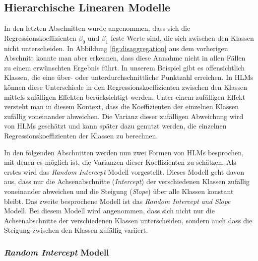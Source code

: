 \documentclass[12pt]{article}\usepackage[]{graphicx}\usepackage[]{color}
\begin{document}
\subsection{Hierarchische Linearen Modelle}
In den letzten Abschnitten wurde angenommen, dass sich die Regressionskoeffizienten $\beta_0$ und $\beta_1$ feste Werte sind, die sich zwischen den Klassen nicht unterscheiden. In Abbildung \ref{fig:disaggregation} aus dem vorherigen Abschnitt konnte man aber erkennen, dass diese Annahme nicht in allen Fällen zu einem erwünschten Ergebnis führt. In unserem Beispiel gibt es offensichtlich Klassen, die eine über- oder unterdurchschnittliche Punktzahl erreichen. In HLMs können diese Unterschiede in den Regressionskoeffizienten zwischen den Klassen mittels zufälligen Effekten berücksichtigt werden. Unter einem zufälligen Effekt versteht man in diesem Kontext, dass die Koeffizienten der einzelnen Klassen zufällig voneinander abweichen. Die Varianz dieser zufälligen Abweichung wird von HLMs geschätzt und kann später dazu genutzt werden, die einzelnen Regressionskoeffizienten der Klassen zu berechnen.

In den folgenden Abschnitten werden nun zwei Formen von HLMs besprochen, mit denen es möglich ist, die Varianzen dieser Koeffizienten zu schätzen. Als erstes wird das \textit{Random Intercept} Modell vorgestellt. Dieses Modell geht davon aus, dass nur die Achsenabschnitte (\textit{Intercept}) der verschiedenen Klassen zufällig voneinander abweichen und die Steigung (\textit{Slope}) über alle Klassen konstant bleibt. Das zweite besprochene Modell ist das \textit{Random Intercept and Slope} Modell. Bei diesem Modell wird angenommen, dass sich nicht nur die Achsenabschnitte der verschiedenen Klassen unterscheiden, sondern auch dass die Steigung zwischen den Klassen zufällig variiert.

\subsubsection{\textit{Random Intercept} Modell} \label{section:random_intercept_model}
\end{document}
